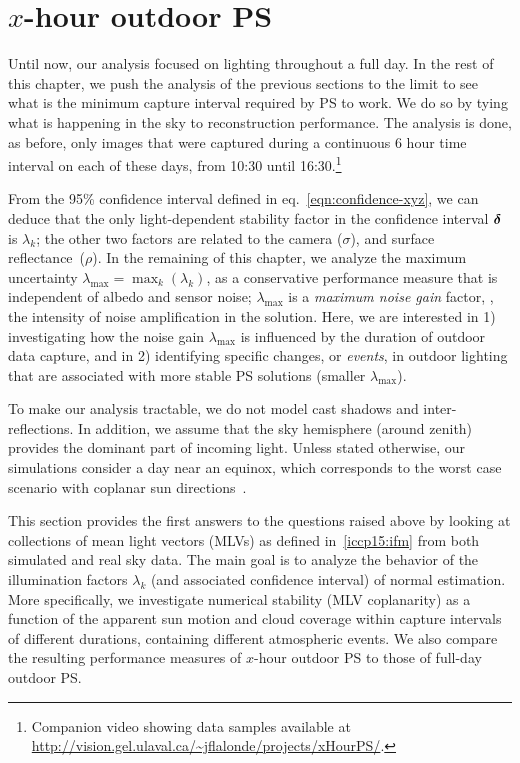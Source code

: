 \section{$x$-hour outdoor PS}
\label{sec:ch1_analysis}

Until now, our analysis focused on lighting throughout a full day. In the rest of this chapter, we push the analysis of the previous sections to the limit to see what is the minimum capture interval required by PS to work. We do so by tying what is happening in the sky to reconstruction performance. The analysis is done, as before, only images that were captured during a continuous 6 hour time interval on each of these days, from 10:30 until 16:30.\footnote{Companion video showing data samples available at \url{http://vision.gel.ulaval.ca/~jflalonde/projects/xHourPS/}.}

From the 95\% confidence interval defined in eq.~\eqref{eqn:confidence-xyz}, we can deduce that the only light-dependent stability factor in the confidence interval $\boldsymbol \delta$ is $\lambda_k$; the other two factors are related to the camera ($\sigma$), and surface reflectance~($\rho$). In the remaining of this chapter, we analyze the maximum uncertainty \mbox{$\lambda_\text{max} = \max_k(\lambda_k)$}, as a conservative performance measure that is independent of albedo and sensor noise; $\lambda_\text{max}$ is a {\em maximum noise gain} factor, \ie, the intensity of noise amplification in the solution. Here, we are interested in 1) investigating how the noise gain $\lambda_\text{max}$ is influenced by the duration of outdoor data capture, and in 2) identifying specific changes, or {\em events}, in outdoor lighting that are associated with more stable PS solutions (smaller $\lambda_\text{max}$).

To make our analysis tractable, we do not model cast shadows and inter-reflections. In addition, we assume that the sky hemisphere (around zenith) provides the dominant part of incoming light. Unless stated otherwise, our simulations consider a day near an equinox, which corresponds to the worst case scenario with coplanar sun directions~\cite{shen-pg-14}.

This section provides the first answers to the questions raised above by looking at collections of mean light vectors (MLVs) as defined in~\ref{iccp15:ifm} from both simulated and real sky data. The main goal is to analyze the behavior of the illumination factors $\lambda_k$ (and associated confidence interval) of normal estimation. More specifically, we investigate numerical stability (MLV coplanarity) as a function of the apparent sun motion and cloud coverage within capture intervals of different durations, containing different atmospheric events. We also compare the resulting performance measures of $x$-hour outdoor PS to those of full-day outdoor PS.

